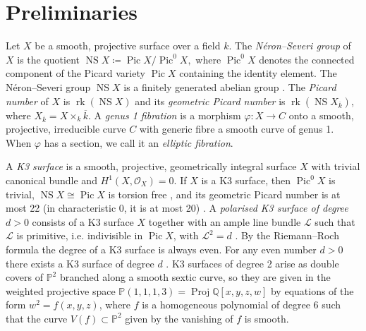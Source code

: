 \documentclass[11pt]{amsart}
\newcommand{\QQ}{\mathbb{Q}}
\newcommand{\PP}{\mathbb{P}}
\theoremstyle{plain}
\theoremstyle{remark}
\begin{document}
\section{Preliminaries} \label{preliminaries}
Let $X$ be a smooth, projective surface over a field $k$. 
The \emph{Néron--Severi group} of $X$ is the quotient \(\operatorname{NS}X\coloneq\operatorname{Pic} X/\operatorname{Pic}^0X,\)
where $\operatorname{Pic}^0X$ denotes the connected component of the Picard variety $\operatorname{Pic}X$ containing the identity element.
The Néron--Severi group $\operatorname{NS}X$ is a finitely generated abelian group \cite[p.~7]{Huyb}. 
The \emph{Picard number} of $X$ is $\operatorname{rk} \left(\operatorname{NS}X\right)$ and its \emph{geometric Picard number} is $\operatorname{rk} \left(\operatorname{NS} X_{\overline{k}}\right)$, where $X_{\overline{k}}=X\times_k \overline{k}$.
A \emph{genus 1 fibration} is a morphism $\varphi:X\rightarrow C$ onto a smooth, projective, irreducible curve $C$ with generic fibre a smooth curve of genus 1. When $\varphi$ has a section, we call it an \emph{elliptic fibration}.

A \emph{K3 surface} is a smooth, projective, geometrically integral surface $X$ with trivial canonical bundle and $H^1(X,\mathcal{O}_X)=0$. If $X$ is a K3 surface, then $\operatorname{Pic}^0X$ is trivial, $\operatorname{NS}X\cong\operatorname{Pic}X$ is torsion free \cite[Proposition VIII.3.2]{Barth}, and its geometric Picard number is at most 22 (in characteristic 0, it is at most 20) \cite[p.~13]{Huyb}. A \emph{polarised K3 surface of degree} $d>0$ consists of a K3 surface $X$ together with an ample line bundle $\mathcal{L}$ such that $\mathcal{L}$ is primitive, i.e. indivisible in $\operatorname{Pic}X$, with $\mathcal{L}^2=d$ \cite[p.~31]{Huyb}.
By the Riemann--Roch formula the degree of a K3 surface is always even. For any even number $d>0$ there exists a K3 surface of degree $d$ \cite[p.~32]{Huyb}. K3 surfaces of degree 2 arise as double covers of $\PP^2$ branched along a smooth sextic curve, so they are given in the weighted projective space $\PP(1,1,1,3)=\operatorname{Proj}\QQ [x,y,z,w]$ by equations of the form $w^2=f(x,y,z)$, where $f$ is a homogeneous polynomial of degree 6 such that the curve $V(f)\subset \PP^2$ given by the vanishing of $f$ is smooth. 
\end{document}
